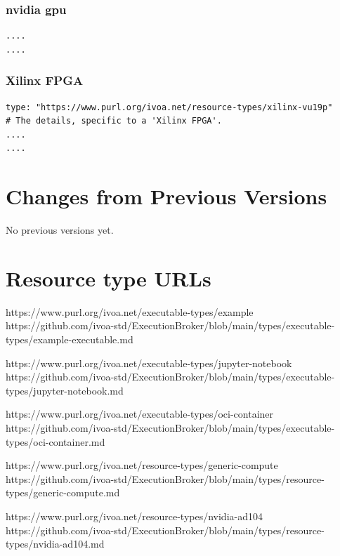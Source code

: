 \documentclass[11pt,a4paper]{ivoa}
\begin{document}
\subsubsection{nvidia gpu}
\label{subsub-datamodel-nvidia-gpu}

\begin{lstlisting}[]
....
....
\end{lstlisting}

\subsubsection{Xilinx FPGA}
\label{subsub-datamodel-xilinx-fpga}

\begin{lstlisting}[]
type: "https://www.purl.org/ivoa.net/resource-types/xilinx-vu19p"
# The details, specific to a 'Xilinx FPGA'.
....
....
\end{lstlisting}


\pagebreak
\appendix
\section{Changes from Previous Versions}
\label{sect-changes}

No previous versions yet.

\pagebreak
\appendix
\section{Resource type URLs}
\label{sect-type-urls}

https://www.purl.org/ivoa.net/executable-types/example
https://github.com/ivoa-std/ExecutionBroker/blob/main/types/executable-types/example-executable.md

https://www.purl.org/ivoa.net/executable-types/jupyter-notebook
https://github.com/ivoa-std/ExecutionBroker/blob/main/types/executable-types/jupyter-notebook.md

https://www.purl.org/ivoa.net/executable-types/oci-container
https://github.com/ivoa-std/ExecutionBroker/blob/main/types/executable-types/oci-container.md

https://www.purl.org/ivoa.net/resource-types/generic-compute
https://github.com/ivoa-std/ExecutionBroker/blob/main/types/resource-types/generic-compute.md

https://www.purl.org/ivoa.net/resource-types/nvidia-ad104
https://github.com/ivoa-std/ExecutionBroker/blob/main/types/resource-types/nvidia-ad104.md
\end{document}
